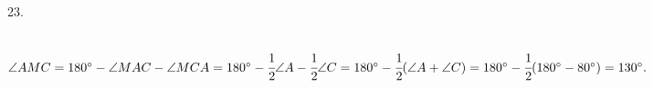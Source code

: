 23. \begin{figure}[ht!]
\end{figure}\\
$\angle AMC=180^\circ-\angle MAC-\angle MCA=180^\circ-\cfrac{1}{2}\angle A-\cfrac{1}{2}\angle C=180^\circ-\cfrac{1}{2}(\angle A+\angle C)=
180^\circ-\cfrac{1}{2}(180^\circ-80^\circ)=130^\circ.$\\
